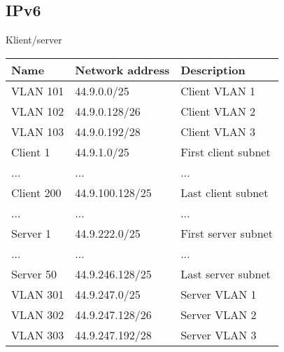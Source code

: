 \documentclass[czech,master,dept460,male,cpp,cpdeclaration]{diploma}
\begin{document}
\subsection{IPv6}
\label{subsec:Sec042}
\noindent Klient/server
\begin{center}
	\begin{tabular}{l|l|l}
		Name & Network address & Description \\
		\hline
		VLAN 101 & 44.9.0.0/25 & Client VLAN 1\\
		VLAN 102 & 44.9.0.128/26 & Client VLAN 2\\
		VLAN 103 & 44.9.0.192/28 & Client VLAN 3\\
		Client 1 & 44.9.1.0/25 & First client subnet\\
		... & ... & ...\\
		Client 200 & 44.9.100.128/25 & Last client subnet\\
		... & ... & ...\\
		Server 1 & 44.9.222.0/25 & First server subnet\\
		... & ... & ...\\
		Server 50 & 44.9.246.128/25 & Last server subnet\\
		VLAN 301 & 44.9.247.0/25 & Server VLAN 1\\
		VLAN 302 & 44.9.247.128/26 & Server VLAN 2\\
		VLAN 303 & 44.9.247.192/28 & Server VLAN 3\\
	\end{tabular}
\end{center}
\end{document}
